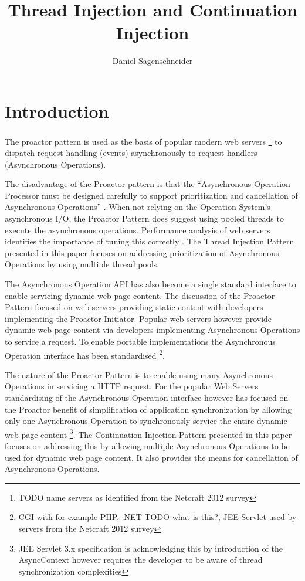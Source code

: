 \documentclass{article}
\begin{document}
\title{Thread Injection and Continuation Injection}
\author{Daniel Sagenschneider}
\date{}
\maketitle

\abstract{}


\section{Introduction}

The proactor pattern \cite{proactor} is used as the basis of popular modern web
servers \footnote{TODO name servers as identified from the Netcraft 2012 survey}
to dispatch request handling (events) asynchronously to request handlers
(Asynchronous Operations).

The disadvantage of the Proactor pattern is that the ``Asynchronous Operation
Processor must be designed carefully to support prioritization and cancellation
of Asynchronous Operations'' \cite{proactor}.  When not relying on the Operation
System's asynchronous I/O, the Proactor Pattern does suggest using pooled
threads to execute the asynchronous operations.  Performance analysis of web
servers identifies the importance of tuning this correctly
\cite{tuning-important,tuning-os-important,low-server-footprint}.  The Thread
Injection Pattern presented in this paper focuses on addressing prioritization
of Asynchronous Operations by using multiple thread pools.

The Asynchronous Operation API has also become a single standard interface to
enable servicing dynamic web page content.  The discussion of the Proactor
Pattern focused on web servers providing static content with developers
implementing the Proactor Initiator.  Popular web servers however provide
dynamic web page content via developers implementing Asynchronous Operations to
service a request.  To enable portable implementations the Asynchronous
Operation interface has been standardised \footnote{CGI with for example PHP,
.NET TODO what is this?, JEE Servlet used by servers from the Netcraft 2012
survey}.

The nature of the Proactor Pattern is to enable using many Asynchronous
Operations in servicing a HTTP request.  For the popular Web Servers
standardising of the Asynchronous Operation interface however has focused on the
Proactor benefit of simplification of application synchronization by allowing
only one Asynchronous Operation to synchronously service the entire dynamic web
page content \footnote{JEE Servlet 3.x specification is acknowledging this by
introduction of the AsyncContext however requires the developer to be aware of
thread synchronization complexities}.  The Continuation Injection Pattern
presented in this paper focuses on addressing this by allowing multiple
Asynchronous Operations to be used for dynamic web page content. It also
provides the means for cancellation of Asynchronous Operations.
\end{document}
